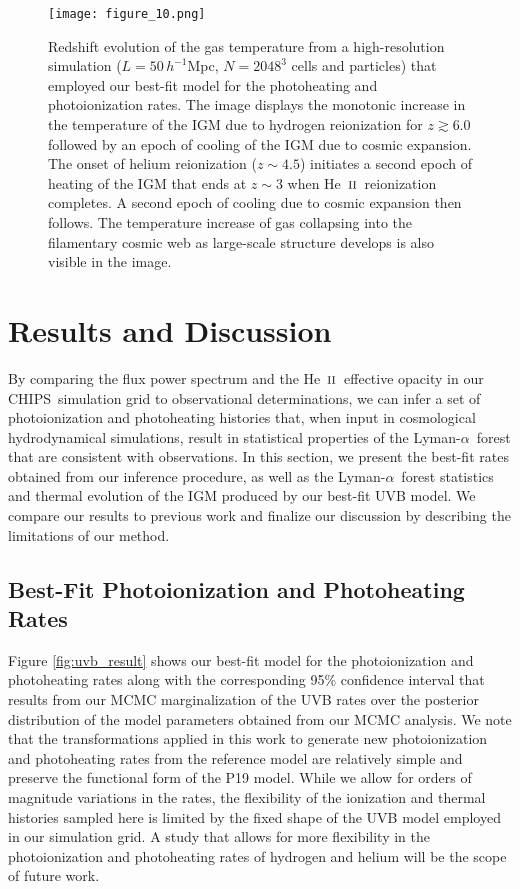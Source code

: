 \documentclass[twocolumn]{aastex62}
\newcommand\Lya{Lyman-$\alpha$}
\newcommand\Sim{CHIPS~}
\def\HeII{\hbox{He~$\scriptstyle\rm II$}}
\begin{document}
\begin{figure*}
\texttt{[image: figure\_10.png]}
\caption{ Redshift evolution of the gas temperature from a high-resolution simulation ($L=50\,h^{-1}$Mpc, $N=2048^3$ cells and particles) that employed our best-fit model 
for the photoheating and photoionization rates. The image displays the monotonic increase in the temperature of the IGM due to hydrogen reionization for $z \gtrsim 6.0$ followed 
by an epoch of cooling of the IGM due to cosmic expansion.
The onset of helium reionization ($z \sim 4.5$) initiates a second epoch of heating of the IGM that ends at $z\sim 3$ when \HeII\ reionization completes.
A second epoch of cooling due to cosmic expansion then follows.
The temperature increase of gas collapsing into the filamentary cosmic web as large-scale structure develops is also visible in the image.}
\label{fig:temperature}
\end{figure*}

\section{Results and Discussion}
\label{sec:discussion}

By comparing the flux power spectrum and the
\HeII\ effective opacity in our \Sim simulation grid to
observational determinations, we can infer a set of photoionization and photoheating histories that, when input in cosmological hydrodynamical simulations, result in statistical properties of the \Lya\ forest that are consistent with observations. 
In this section, we present the best-fit rates obtained from our inference procedure, as well as the \Lya\ forest statistics 
and thermal evolution of the IGM produced by our best-fit UVB model.
We compare our results to previous work and finalize our discussion by describing the limitations of our method. 

\subsection{Best-Fit Photoionization and Photoheating Rates}
\label{sec:result_uvb_rates}


Figure \ref{fig:uvb_result} shows our  best-fit model for the photoionization and photoheating rates along with the corresponding 95\% confidence 
interval that results from our MCMC marginalization of the UVB rates over the posterior distribution of the model parameters obtained from  our MCMC analysis. We note that the 
transformations applied in this work  to generate new photoionization and photoheating rates from the reference model \citep{puchwein2019a} are relatively simple and preserve the functional form of 
the P19 model. While we allow for orders of magnitude variations in the rates,
the flexibility of the ionization and thermal histories sampled here is limited by the fixed shape of the UVB model employed in our simulation grid. A study that allows for more flexibility 
in the photoionization and photoheating rates of hydrogen and helium will be the scope of future work.  
\end{document}
